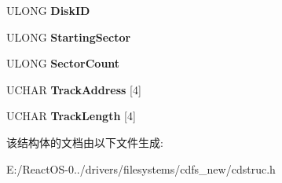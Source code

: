 \begin{DoxyCompactItemize}
\item 
\mbox{\label{struct___a_u_d_i_o___p_l_a_y___h_e_a_d_e_r_ac4d6082353fcb397fc7bfb657825b011}} 
U\+L\+O\+NG {\bfseries Disk\+ID}
\item 
\mbox{\label{struct___a_u_d_i_o___p_l_a_y___h_e_a_d_e_r_aca2e091ba0a3ec51338d968640928036}} 
U\+L\+O\+NG {\bfseries Starting\+Sector}
\item 
\mbox{\label{struct___a_u_d_i_o___p_l_a_y___h_e_a_d_e_r_a2776c964e45d42e564d55ab2ba30f396}} 
U\+L\+O\+NG {\bfseries Sector\+Count}
\item 
\mbox{\label{struct___a_u_d_i_o___p_l_a_y___h_e_a_d_e_r_a64b2d1960fc8c7e3fd26dee41e8ed90f}} 
U\+C\+H\+AR {\bfseries Track\+Address} \mbox{[}4\mbox{]}
\item 
\mbox{\label{struct___a_u_d_i_o___p_l_a_y___h_e_a_d_e_r_a1c6cecb00923c8dff9b8fde07ec48abe}} 
U\+C\+H\+AR {\bfseries Track\+Length} \mbox{[}4\mbox{]}
\end{DoxyCompactItemize}


该结构体的文档由以下文件生成\+:\begin{DoxyCompactItemize}
\item 
E\+:/\+React\+O\+S-\/0../drivers/filesystems/cdfs\+\_\+new/cdstruc.\+h\end{DoxyCompactItemize}
